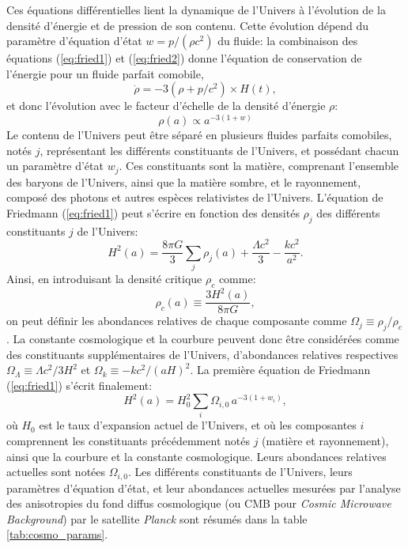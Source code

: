 Ces équations différentielles lient la dynamique de l'Univers à l'évolution de la densité d'énergie et de pression de son contenu.
Cette évolution dépend du paramètre d'équation d'état $w=p/(\rho c^2)$ du fluide: la combinaison des équations (\ref{eq:fried1}) et (\ref{eq:fried2}) donne l'équation de conservation de l'énergie pour un fluide parfait comobile,
\begin{equation}
    \dot{\rho} = -3(\rho + p/c^2) \times H(t),
\end{equation}
et donc l'évolution avec le facteur d'échelle de la densité d'énergie $\rho$:
\begin{equation}
    \label{eq:rho_w}
    \rho(a) \propto a^{-3(1+w)}
\end{equation}
Le contenu de l'Univers peut être séparé en plusieurs fluides parfaits comobiles, notés $j$, représentant les différents constituants de l'Univers, et possédant chacun un paramètre d'état $w_j$.
Ces constituants sont la matière, comprenant l'ensemble des baryons de l'Univers, ainsi que la matière sombre, et le rayonnement, composé des photons et autres espèces relativistes de l'Univers.
L'équation de Friedmann (\ref{eq:fried1}) peut s'écrire en fonction des densités $\rho_j$ des différents constituants $j$ de l'Univers:
\begin{equation}
    H^2(a) = \frac{8\pi G}{3 }\sum_j \rho_j(a) + \frac{\Lambda c^2}{3} - \frac{kc^2}{a^2}.
\end{equation}
Ainsi, en introduisant la densité critique $\rho_c$ comme:
\begin{equation}
    \label{eq:rho_crit}
    \rho_c(a) \equiv \frac{3 H^2(a)}{8 \pi G},
\end{equation}
on peut définir les abondances relatives de chaque composante comme $\Omega_j \equiv \rho_j / \rho_c$.
La constante cosmologique et la courbure peuvent donc être considérées comme des constituants supplémentaires de l'Univers, d'abondances relatives respectives $\Omega_\Lambda \equiv \Lambda c^2 / 3H^2$ et $\Omega_k \equiv -kc^2 / (aH)^2$.
La première équation de Friedmann (\ref{eq:fried1}) s'écrit finalement:
\begin{equation}
    \label{eq:fried_omega}
    H^2(a) = H_0^2 \sum_i \Omega_{i,0} \, a^{-3(1+w_i)},
\end{equation}
où $H_0$ est le taux d'expansion actuel de l'Univers, et où les composantes $i$ comprennent les constituants précédemment notés $j$ (matière et rayonnement), ainsi que la courbure et la constante cosmologique.
Leurs abondances relatives actuelles sont notées $\Omega_{i,0}$.
Les différents constituants de l'Univers, leurs paramètres d'équation d'état, et leur abondances actuelles mesurées par l'analyse des anisotropies du fond diffus cosmologique (ou CMB pour \textit{Cosmic Microwave Background}) par le satellite \textit{Planck} \cite{planck_collaboration_planck_2020} sont résumés dans la table \ref{tab:cosmo_params}.

